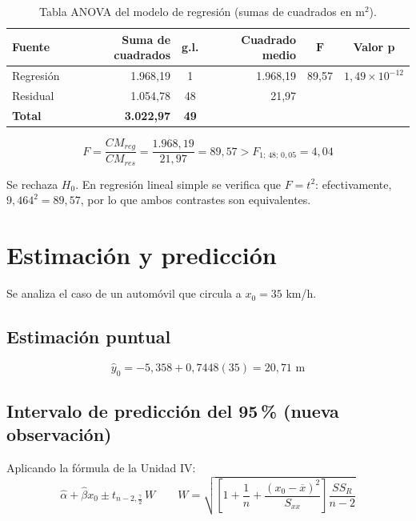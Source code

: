 \documentclass[12pt,a4paper]{article}
\begin{document}
\begin{table}[H]
\centering
\caption{Tabla ANOVA del modelo de regresión (sumas de cuadrados en m$^2$).}
\begin{tabular}{lrcrcc}
\toprule
\textbf{Fuente} & \textbf{Suma de cuadrados} & \textbf{g.l.} & \textbf{Cuadrado medio} & $\boldsymbol{F}$ & \textbf{Valor p} \\
\midrule
Regresión & 1.968{,}19 & 1 & 1.968{,}19 & 89{,}57 & $1{,}49 \times 10^{-12}$ \\
Residual & 1.054{,}78 & 48 & 21{,}97 & & \\
\midrule
\textbf{Total} & \textbf{3.022{,}97} & \textbf{49} & & & \\
\bottomrule
\end{tabular}
\end{table}

\begin{equation}
F = \frac{CM_{reg}}{CM_{res}} = \frac{1.968{,}19}{21{,}97} = 89{,}57 > F_{1;\,48;\,0{,}05} = 4{,}04
\end{equation}

Se rechaza $H_0$. En regresión lineal simple se verifica que $F = t^2$: efectivamente, $9{,}464^2 = 89{,}57$, por lo que ambos contrastes son equivalentes.

\section{Estimación y predicción}

Se analiza el caso de un automóvil que circula a $x_0 = 35$ km/h.

\subsection{Estimación puntual}

\begin{equation}
\hat{y}_0 = -5{,}358 + 0{,}7448(35) = 20{,}71 \text{ m}
\end{equation}

\subsection{Intervalo de predicción del 95\,\% (nueva observación)}

Aplicando la fórmula de la Unidad IV:
\begin{equation}
\hat{\alpha} + \hat{\beta}x_0 \pm t_{n-2,\frac{\gamma}{2}}\,W
\qquad
W = \sqrt{\left[1 + \frac{1}{n} + \frac{(x_0 - \overline{x})^2}{S_{xx}}\right]\frac{SS_R}{n-2}}
\end{equation}
\end{document}
